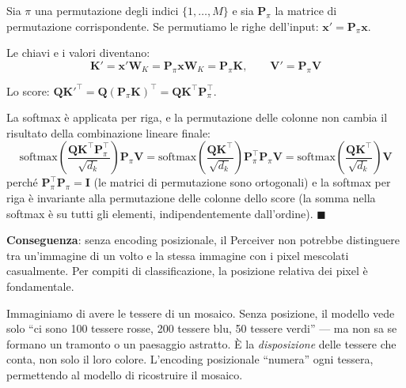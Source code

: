 \documentclass[12pt,a4paper]{article}
\begin{document}
\begin{proofbox}
Sia $\pi$ una permutazione degli indici $\{1, \ldots, M\}$ e sia $\mathbf{P}_\pi$ la matrice di permutazione corrispondente. Se permutiamo le righe dell'input: $\mathbf{x}' = \mathbf{P}_\pi \mathbf{x}$.

Le chiavi e i valori diventano:
\[
    \mathbf{K}' = \mathbf{x}' \mathbf{W}_K = \mathbf{P}_\pi \mathbf{x} \mathbf{W}_K = \mathbf{P}_\pi \mathbf{K}, \qquad \mathbf{V}' = \mathbf{P}_\pi \mathbf{V}
\]

Lo score: $\mathbf{Q} {\mathbf{K}'}^\top = \mathbf{Q} (\mathbf{P}_\pi \mathbf{K})^\top = \mathbf{Q} \mathbf{K}^\top \mathbf{P}_\pi^\top$.

La softmax \`e applicata per riga, e la permutazione delle colonne non cambia il risultato della combinazione lineare finale:
\[
    \text{softmax}\!\left(\frac{\mathbf{Q} \mathbf{K}^\top \mathbf{P}_\pi^\top}{\sqrt{d_k}}\right) \mathbf{P}_\pi \mathbf{V} = \text{softmax}\!\left(\frac{\mathbf{Q} \mathbf{K}^\top}{\sqrt{d_k}}\right) \mathbf{P}_\pi^\top \mathbf{P}_\pi \mathbf{V} = \text{softmax}\!\left(\frac{\mathbf{Q} \mathbf{K}^\top}{\sqrt{d_k}}\right) \mathbf{V}
\]
perch\'e $\mathbf{P}_\pi^\top \mathbf{P}_\pi = \mathbf{I}$ (le matrici di permutazione sono ortogonali) e la softmax per riga \`e invariante alla permutazione delle colonne dello score (la somma nella softmax \`e su tutti gli elementi, indipendentemente dall'ordine). $\blacksquare$
\end{proofbox}

\textbf{Conseguenza}: senza encoding posizionale, il Perceiver non potrebbe distinguere tra un'immagine di un volto e la stessa immagine con i pixel mescolati casualmente. Per compiti di classificazione, la posizione relativa dei pixel \`e fondamentale.

\begin{notabox}
Immaginiamo di avere le tessere di un mosaico. Senza posizione, il modello vede solo ``ci sono 100 tessere rosse, 200 tessere blu, 50 tessere verdi'' --- ma non sa se formano un tramonto o un paesaggio astratto. \`E la \emph{disposizione} delle tessere che conta, non solo il loro colore. L'encoding posizionale ``numera'' ogni tessera, permettendo al modello di ricostruire il mosaico.
\end{notabox}
\end{document}
